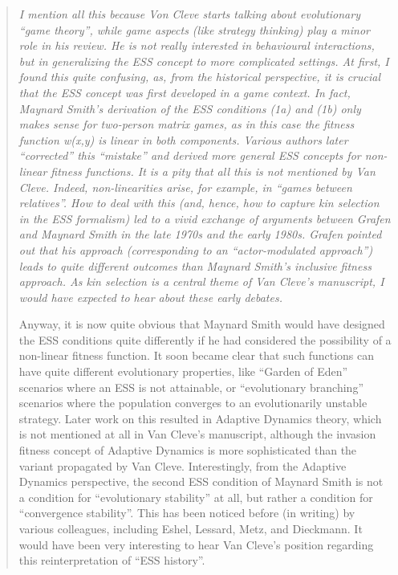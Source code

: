 \documentclass[10pt,parskip=full,foldmarks=off,addrfield=off,backaddress=false,refline=dateleft,letterpaper]{scrlttr2}
\newenvironment{reviewerquote}{\begin{quote}\color{DarkBlue}\itshape}{\end{quote}}
\begin{document}
\begin{letter}
\begin{reviewerquote}
I mention all this because Von Cleve starts talking about evolutionary “game theory”, while game aspects (like strategy thinking) play a minor role in his review. He is not really interested in behavioural interactions, but in generalizing the ESS concept to more complicated settings. At first, I found this quite confusing, as, from the historical perspective, it is crucial that the ESS concept was first developed in a game context. In fact, Maynard Smith’s derivation of the ESS conditions (1a) and (1b) only makes sense for two-person matrix games, as in this case the fitness function w(x,y) is linear in both components. Various authors later “corrected” this “mistake” and derived more general ESS concepts for non-linear fitness functions. It is a pity that all this is not mentioned by Van Cleve. Indeed, non-linearities arise, for example, in “games between relatives”. How to deal with this (and, hence, how to capture kin selection in the ESS formalism) led to a vivid exchange of arguments between Grafen and Maynard Smith in the late 1970s and the early 1980s. Grafen pointed out that his approach (corresponding to an “actor-modulated approach”) leads to quite different outcomes than Maynard Smith’s inclusive fitness approach. As kin selection is a central theme of Van Cleve’s manuscript, I would have expected to hear about these early debates.

Anyway, it is now quite obvious that Maynard Smith would have designed the ESS conditions quite differently if he had considered the possibility of a non-linear fitness function. It soon became clear that such functions can have quite different evolutionary properties, like “Garden of Eden” scenarios where an ESS is not attainable, or “evolutionary branching” scenarios where the population converges to an evolutionarily unstable strategy. Later work on this resulted in Adaptive Dynamics theory, which is not mentioned at all in Van Cleve’s manuscript, although the invasion fitness concept of Adaptive Dynamics is more sophisticated than the variant propagated by Van Cleve. Interestingly, from the Adaptive Dynamics perspective, the second ESS condition of Maynard Smith is not a condition for “evolutionary stability” at all, but rather a condition for “convergence stability”. This has been noticed before (in writing) by various colleagues, including Eshel, Lessard, Metz, and Dieckmann. It would have been very interesting to hear Van Cleve’s position regarding this reinterpretation of “ESS history”.


\end{reviewerquote}
\end{letter}
\end{document}
